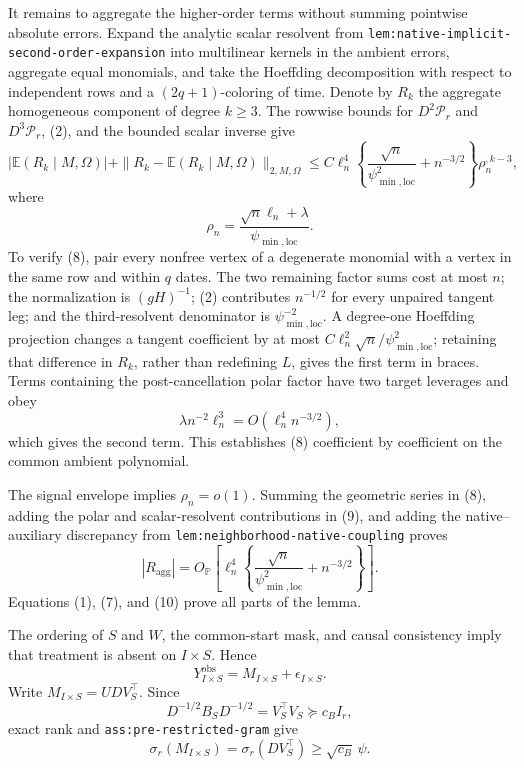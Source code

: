 It remains to aggregate the higher-order terms without summing pointwise absolute errors.  Expand the analytic scalar resolvent from \texttt{lem:native-implicit-second-order-expansion} into multilinear kernels in the ambient errors, aggregate equal monomials, and take the Hoeffding decomposition with respect to independent rows and a \((2q+1)\)-coloring of time.  Denote by \(R_k\) the aggregate homogeneous component of degree \(k\ge3\).  The rowwise bounds for \(D^2\mathcal P_r\) and \(D^3\mathcal P_r\), (2), and the bounded scalar inverse give
\[
 |\mathbb E(R_k\mid M,\Omega)|
 +\|R_k-\mathbb E(R_k\mid M,\Omega)\|_{2,M,\Omega}
 \le C\ell_n^4
 \left\{\frac{\sqrt n}{\psi_{\min,\mathrm{loc}}^2}+n^{-3/2}\right\}
 \rho_n^{,k-3},
 \tag{8}
\]
where
\[
 \rho_n=\frac{\sqrt n\ell_n+\lambda}{\psi_{\min,\mathrm{loc}}}.
\]
To verify (8), pair every nonfree vertex of a degenerate monomial with a vertex in the same row and within \(q\) dates.  The two remaining factor sums cost at most \(n\); the normalization is \((gH)^{-1}\); (2) contributes \(n^{-1/2}\) for every unpaired tangent leg; and the third-resolvent denominator is \(\psi_{\min,\mathrm{loc}}^{-2}\).  A degree-one Hoeffding projection changes a tangent coefficient by at most \(C\ell_n^2\sqrt n/\psi_{\min,\mathrm{loc}}^2\); retaining that difference in \(R_k\), rather than redefining \(L\), gives the first term in braces.  Terms containing the post-cancellation polar factor have two target leverages and obey
\[
 \lambda n^{-2}\ell_n^3
 =O(\ell_n^4n^{-3/2}),
 \tag{9}
\]
which gives the second term.  This establishes (8) coefficient by coefficient on the common ambient polynomial.

The signal envelope implies \(\rho_n=o(1)\).  Summing the geometric series in (8), adding the polar and scalar-resolvent contributions in (9), and adding the native--auxiliary discrepancy from \texttt{lem:neighborhood-native-coupling} proves
\[
 |R_{\mathrm{agg}}|=O_{\mathbb P}\!\left[
 \ell_n^4\left\{\frac{\sqrt n}{\psi_{\min,\mathrm{loc}}^2}
 +n^{-3/2}\right\}\right].
 \tag{10}
\]
Equations (1), (7), and (10) prove all parts of the lemma.

The ordering of \(S\) and \(W\), the common-start mask, and causal consistency imply that treatment is absent on \(I\times S\).  Hence
\[
 Y^{\mathrm{obs}}_{I\times S}=M_{I\times S}+\epsilon_{I\times S}.
 \tag{1}
\]
Write \(M_{I\times S}=UDV_S^{\top}\).  Since
\[
 D^{-1/2}B_SD^{-1/2}=V_S^{\top}V_S\succeq c_BI_r,
\]
exact rank and \texttt{ass:pre-restricted-gram} give
\[
 \sigma_r(M_{I\times S})
 =\sigma_r(DV_S^{\top})\ge \sqrt{c_B}\,\psi.
 \tag{2}
\]

